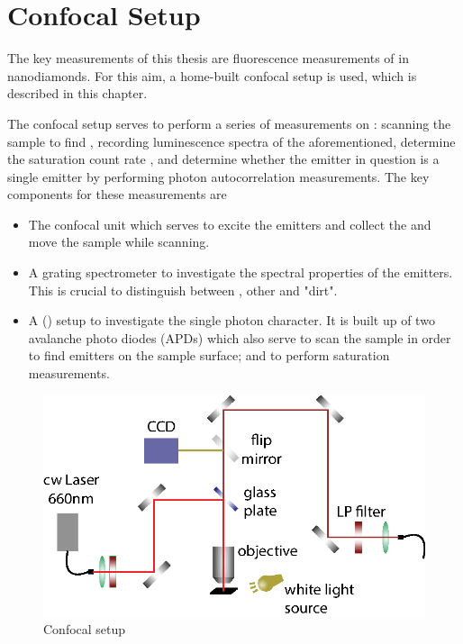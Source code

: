 
\chapter{Confocal Setup}	\label{ch::confocal_setup}

	The key measurements of this thesis are fluorescence measurements of \sivs in nanodiamonds.
	For this aim, a home-built confocal setup is used, which is described in this chapter.

	The confocal setup serves to perform a series of measurements on \fl: scanning the sample to find \sivs, recording luminescence spectra of the aforementioned, determine the saturation count rate , and determine whether the emitter in question is a single emitter by performing photon autocorrelation measurements.
	The key components for these measurements are 

	\begin{itemize}
		\item The confocal unit which serves to excite the emitters and collect the \fl and move the sample while scanning.
		\item A grating spectrometer to investigate the spectral properties of the emitters. This is crucial to distinguish between \sivs, other \ccs and "dirt".
		\item A \keyword{\HBT} (\hbt) setup to investigate the single photon character. It is built up of two avalanche photo diodes (APDs) which also serve to scan the sample in order to find emitters on the sample surface; and to perform saturation measurements.
	\end{itemize}


	\begin{figure}[t] %
		\centering
		\includegraphics[width=\linewidth]{./pics/confocal_setup.eps}
		\caption{Confocal setup}
		\label{fig::confocal_setup}
	\end{figure}

